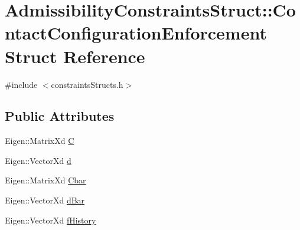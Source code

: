 \hypertarget{structAdmissibilityConstraintsStruct_1_1ContactConfigurationEnforcement}{\section{\-Admissibility\-Constraints\-Struct\-:\-:\-Contact\-Configuration\-Enforcement \-Struct \-Reference}
\label{structAdmissibilityConstraintsStruct_1_1ContactConfigurationEnforcement}
}


{\ttfamily \#include $<$constraints\-Structs.\-h$>$}

\subsection*{\-Public \-Attributes}
\begin{DoxyCompactItemize}
\item 
\-Eigen\-::\-Matrix\-Xd \hyperlink{structAdmissibilityConstraintsStruct_1_1ContactConfigurationEnforcement_a6688d4bb3e397219074bcf5699ffca55}{\-C}
\item 
\-Eigen\-::\-Vector\-Xd \hyperlink{structAdmissibilityConstraintsStruct_1_1ContactConfigurationEnforcement_a43ec5c057d018f841c08a82d3806c6b4}{d}
\item 
\-Eigen\-::\-Matrix\-Xd \hyperlink{structAdmissibilityConstraintsStruct_1_1ContactConfigurationEnforcement_a60be82cc4c6c03f69a6b01a4a210dbec}{\-Cbar}
\item 
\-Eigen\-::\-Vector\-Xd \hyperlink{structAdmissibilityConstraintsStruct_1_1ContactConfigurationEnforcement_a0061c6cddeac4d3cb4d5bfc68cb21026}{d\-Bar}
\item 
\-Eigen\-::\-Vector\-Xd \hyperlink{structAdmissibilityConstraintsStruct_1_1ContactConfigurationEnforcement_a3ca6a4f62e9f1c5c5465fce49020a72b}{f\-History}
\end{DoxyCompactItemize}


